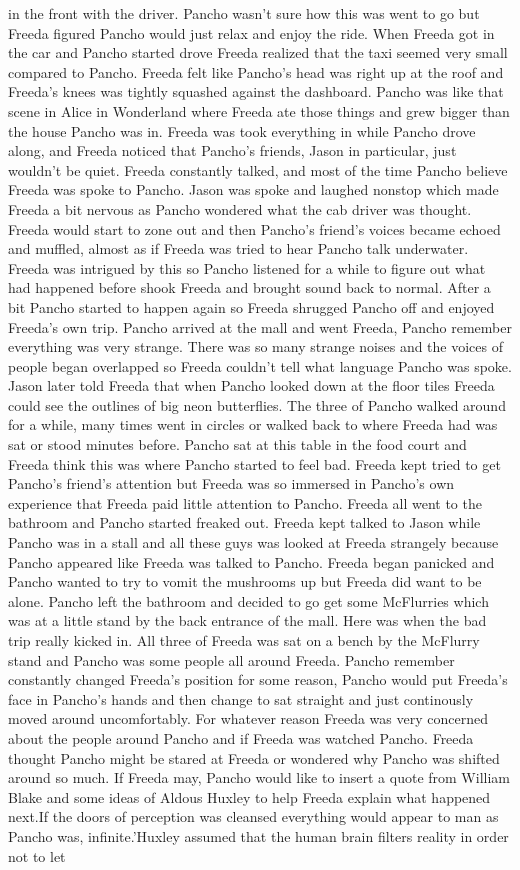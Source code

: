 \documentclass[12pt]{book}
\begin{document}
in the front with the driver. Pancho wasn't sure how this was went to go but Freeda figured Pancho would just relax and enjoy the ride. When Freeda got in the car and Pancho started drove Freeda realized that the taxi seemed very small compared to Pancho. Freeda felt like Pancho's head was right up at the roof and Freeda's knees was tightly squashed against the dashboard. Pancho was like that scene in Alice in Wonderland where Freeda ate those things and grew bigger than the house Pancho was in. Freeda was took everything in while Pancho drove along, and Freeda noticed that Pancho's friends, Jason in particular, just wouldn't be quiet. Freeda constantly talked, and most of the time Pancho believe Freeda was spoke to Pancho. Jason was spoke and laughed nonstop which made Freeda a bit nervous as Pancho wondered what the cab driver was thought. Freeda would start to zone out and then Pancho's friend's voices became echoed and muffled, almost as if Freeda was tried to hear Pancho talk underwater. Freeda was intrigued by this so Pancho listened for a while to figure out what had happened before shook Freeda and brought sound back to normal. After a bit Pancho started to happen again so Freeda shrugged Pancho off and enjoyed Freeda's own trip. Pancho arrived at the mall and went Freeda, Pancho remember everything was very strange. There was so many strange noises and the voices of people began overlapped so Freeda couldn't tell what language Pancho was spoke. Jason later told Freeda that when Pancho looked down at the floor tiles Freeda could see the outlines of big neon butterflies. The three of Pancho walked around for a while, many times went in circles or walked back to where Freeda had was sat or stood minutes before. Pancho sat at this table in the food court and Freeda think this was where Pancho started to feel bad. Freeda kept tried to get Pancho's friend's attention but Freeda was so immersed in Pancho's own experience that Freeda paid little attention to Pancho. Freeda all went to the bathroom and Pancho started freaked out. Freeda kept talked to Jason while Pancho was in a stall and all these guys was looked at Freeda strangely because Pancho appeared like Freeda was talked to Pancho. Freeda began panicked and Pancho wanted to try to vomit the mushrooms up but Freeda did want to be alone. Pancho left the bathroom and decided to go get some McFlurries which was at a little stand by the back entrance of the mall. Here was when the bad trip really kicked in. All three of Freeda was sat on a bench by the McFlurry stand and Pancho was some people all around Freeda. Pancho remember constantly changed Freeda's position for some reason, Pancho would put Freeda's face in Pancho's hands and then change to sat straight and just continously moved around uncomfortably. For whatever reason Freeda was very concerned about the people around Pancho and if Freeda was watched Pancho. Freeda thought Pancho might be stared at Freeda or wondered why Pancho was shifted around so much. If Freeda may, Pancho would like to insert a quote from William Blake and some ideas of Aldous Huxley to help Freeda explain what happened next.If the doors of perception was cleansed everything would appear to man as Pancho was, infinite.'Huxley assumed that the human brain filters reality in order not to let 
\end{document}
